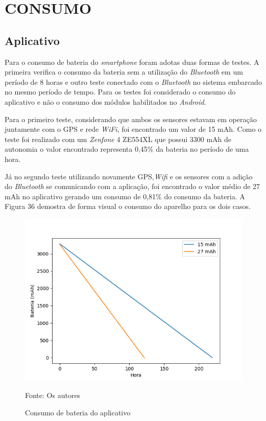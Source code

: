 \section{CONSUMO}

\subsection{\textbf{Aplicativo}}

Para o consumo de bateria do \textit{smartphone} foram adotas duas formas de testes. A primeira verifica o consumo da bateria sem a utilização do \textit{Bluetooth} em um período de 8 horas e outro teste conectado com o \textit{Bluetooth} no sistema embarcado no mesmo período de tempo. Para os testes foi considerado o consumo do aplicativo e não o consumo dos módulos habilitados no \textit{Android}.

Para o primeiro teste, considerando que ambos os sensores estavam em operação juntamente com o GPS e rede \textit{WiFi}, foi encontrado um valor de 15 mAh.
Como o teste foi realizado com um \textit{Zenfone} 4 ZE554XL que possui 3300 mAh de autonomia o valor encontrado representa  0,45\% da bateria no período de uma  hora.

Já no segundo teste utilizando novamente GPS,\textit{Wifi} e os sensores com a adição do \textit{Bluetooth} se comunicando com a aplicação, foi encontrado o valor médio de  27 mAh no aplicativo gerando um consumo de 0,81\% do consumo da bateria. A Figura 36 demostra de forma visual o consumo do aparelho para os dois casos.


 \begin{figure}[H]

\begin{center}
     \caption{Consumo de bateria do aplicativo}
  \includegraphics[width=150mm]{images/Cap5/consumo_grafico.png}
\end{center}
 \scriptsize Fonte: Os autores
  
\end{figure}


